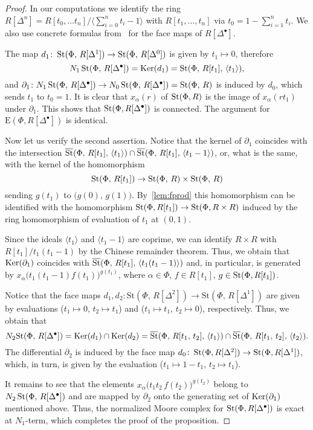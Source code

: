 \documentclass[oneside, 11pt]{amsart} \pdfoutput=1
\begin{document}
\begin{proof}
In our computations we identify the ring $R[\Delta^n] = R[t_0,\ldots t_n]/\langle \sum_{i=0}^n t_i -1 \rangle$ with $R[t_1, \ldots, t_n]$ via $t_0 = 1 - \sum_{i=1}^n t_i$. We also use concrete formulas from~\cite{Jar83} for the face maps of $R[\Delta^\bullet]$.

The map $d_1\colon\mathop{\mathrm{St}}\nolimits(\Phi,\,R[\Delta^1])\rightarrow\mathop{\mathrm{St}}\nolimits(\Phi,\,R[\Delta^0])$ is given by $t_1\mapsto0$, therefore \[N_1\mathop{\mathrm{St}}\nolimits(\Phi,\,R[\Delta^\bullet])=\mathop{\mathrm{Ker}}\nolimits(d_1)=\mathop{\mathrm{St}}\nolimits(\Phi,\,R[t_1],\,\langle t_1\rangle),\]
and $\partial_1\colon N_1\mathop{\mathrm{St}}\nolimits(\Phi,\,R[\Delta^\bullet])\rightarrow N_0\mathop{\mathrm{St}}\nolimits(\Phi,\,R[\Delta^\bullet])=\mathop{\mathrm{St}}\nolimits(\Phi,\,R)$ is induced by $d_0$, which sends $t_1$ to $t_0=1$. 
It is clear that $x_\alpha(r)$ of $\mathop{\mathrm{St}}\nolimits(\Phi, R)$ is the image of $x_\alpha(rt_1)$ under $\partial_1$.
This shows that $\mathop{\mathrm{St}}\nolimits(\Phi, R[\Delta^\bullet])$ is connected. The argument for $\mathrm{E}(\Phi, R[\Delta^\bullet])$ is identical.

Now let us verify the second assertion. Notice that the kernel of $\partial_1$ coincides with the intersection $\overline{\mathop{\mathrm{St}}\nolimits}(\Phi,\,R[t_1],\,\langle t_1\rangle)\cap\overline{\mathop{\mathrm{St}}\nolimits}(\Phi,\,R[t_1],\,\langle t_1-1 \rangle )$, or, what is the same, with the kernel of the homomorphism
\[\mathop{\mathrm{St}}\nolimits(\Phi,\,R[t_1])\rightarrow\mathop{\mathrm{St}}\nolimits(\Phi,\,R)\times\mathop{\mathrm{St}}\nolimits(\Phi,\,R)\]
sending $g(t_1)$ to $\big(g(0),\,g(1)\big)$. By~\cref{lem:fprod} this homomorphism can be identified with the homomorphism $\mathop{\mathrm{St}}\nolimits(\Phi, R[t_1]) \to \mathop{\mathrm{St}}\nolimits(\Phi, R\times R)$ induced by the ring homomorphism of evaluation of $t_1$ at $(0, 1)$.

Since the ideals $\langle t_1 \rangle$ and $\langle t_1-1 \rangle$ are coprime, we can identify $R\times R$ with $R[t_1]/t_1(t_1-1)$ by the Chinese remainder theorem. Thus, we obtain that $\mathop{\mathrm{Ker}}\nolimits(\partial_1)$ coincides with $\overline{\mathop{\mathrm{St}}\nolimits}(\Phi,\,R[t_1],\,\langle t_1(t_1-1) \rangle)$ and, in particular, is generated by $x_\alpha\big(t_1(t_1-1)f(t_1)\big)^{g(t_1)}$, where $\alpha \in \Phi$, $f\in R[t_1]$, $g \in \mathop{\mathrm{St}}\nolimits(\Phi, R[t_1])$.

Notice that the face maps $d_1, d_2\colon\mathrm{St}(\Phi,\,R[\Delta^2])\rightarrow\mathrm{St}(\Phi,\,R[\Delta^1])$ are given by evaluations ($t_1\mapsto0$, $t_2\mapsto t_1$) and ($t_1\mapsto t_1$, $t_2\mapsto0$), respectively. Thus, we obtain that \[N_2\mathrm{St}(\Phi,\,R[\Delta^\bullet])=\mathop{\mathrm{Ker}}\nolimits(d_1)\cap\mathop{\mathrm{Ker}}\nolimits(d_2)=\overline{\mathop{\mathrm{St}}\nolimits}(\Phi,\,R[t_1,\,t_2],\,\langle t_1\rangle )\cap\overline{\mathop{\mathrm{St}}\nolimits}(\Phi,\,R[t_1,\,t_2],\,\langle t_2\rangle).\]
The differential $\partial_2$ is induced by the face map $d_0 \colon \mathop{\mathrm{St}}\nolimits(\Phi, R[\Delta^2]) \to \mathop{\mathrm{St}}\nolimits(\Phi, R[\Delta^1])$, which, in turn, is given by the evaluation ($t_1 \mapsto 1-t_1$, $t_2 \mapsto t_1$). 

It remains to see that the elements $x_{\alpha}\big(t_1t_2\,f(t_2)\big)^{g(t_2)}$ belong to $N_2\mathop{\mathrm{St}}\nolimits(\Phi,\,R[\Delta^\bullet])$ and are mapped by $\partial_2$ onto the generating set of $\mathop{\mathrm{Ker}}\nolimits(\partial_1)$ mentioned above. Thus, the normalized Moore complex for $\mathop{\mathrm{St}}\nolimits(\Phi, R[\Delta^\bullet])$ is exact at $N_1$-term, which completes the proof of the proposition. \end{proof}
\end{document}
